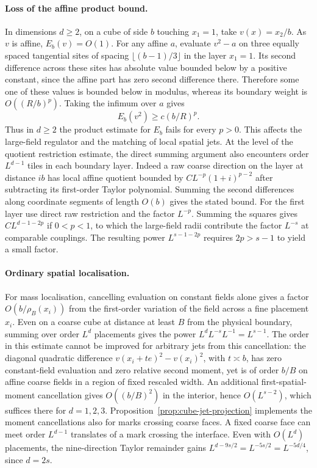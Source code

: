 \documentclass[11pt]{article}
\theoremstyle{definition}
\begin{document}
\paragraph{Loss of the affine product bound.}
In dimensions \(d\ge2\), on a cube of side \(b\) touching \(x_1=1\), take
\(v(x)=x_2/b\). As \(v\) is affine, \(E_b(v)=O(1)\).
For any affine \(a\), evaluate \(v^2-a\) on three equally spaced
tangential sites of spacing \(\lfloor (b-1)/3\rfloor\) in the layer
\(x_1=1\). Its second difference across these sites has absolute
value bounded below by a positive constant, since the affine part
has zero second difference there. Therefore some one of these
values is bounded below in modulus, whereas its boundary weight
is \(O((R/b)^p)\). Taking the infimum over \(a\) gives
\begin{equation}
 E_b(v^2)\ge c(b/R)^p .
\end{equation}
Thus in \(d\ge2\) the product estimate for \(E_b\) fails for every \(p>0\). This affects the
large-field regulator and the matching of local spatial jets.
At the level of the quotient restriction estimate, the direct
summing argument also encounters order \(L^{d-1}\) tiles in each
boundary layer. Indeed a raw coarse direction on the layer at
distance \(i b\) has local affine quotient bounded by
\(C L^{-p}(1+i)^{p-2}\) after subtracting its first-order Taylor
polynomial. Summing the second differences along coordinate
segments of length \(O(b)\) gives the stated bound. For the first layer use direct raw
restriction and the factor \(L^{-p}\). Summing the squares gives
\(C L^{d-1-2p}\) if \(0<p<1\), to which the large-field radii
contribute the factor \(L^{-s}\) at comparable couplings.
The resulting power \(L^{s-1-2p}\) requires \(2p>s-1\) to
yield a small factor.

\paragraph{Ordinary spatial localisation.}
For mass localisation, cancelling evaluation on constant fields
alone gives a factor \(O(b/\rho_B(x_i))\) from the first-order
variation of the field across a fine placement \(x_i\). Even
on a coarse cube at distance at least \(B\) from the physical
boundary, summing over order \(L^d\) placements gives the power
\(L^d L^{-s}L^{-1}=L^{s-1}\). The order in this estimate cannot be
improved for arbitrary jets from this cancellation: the diagonal
quadratic difference \(v(x_i+te)^2-v(x_i)^2\), with
\(t\asymp b\), has zero constant-field evaluation and zero
relative second moment, yet is of order \(b/B\) on affine
coarse fields in a region of fixed rescaled width. An additional
first-spatial-moment cancellation gives \(O((b/B)^2)\) in the
interior, hence \(O(L^{s-2})\), which suffices there for \(d=1,2,3\).
Proposition~\ref{prop:cube-jet-projection} implements the moment
cancellations also for marks crossing coarse faces. A fixed coarse
face can meet order \(L^{d-1}\) translates of a mark crossing the
interface. Even with \(O(L^d)\) placements, the nine-direction Taylor
remainder gains \(L^{d-9s/2}=L^{-5s/2}=L^{-5d/4}\), since \(d=2s\).
\end{document}
